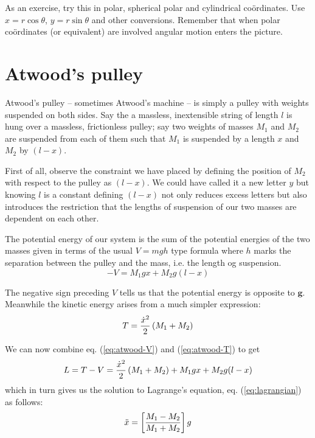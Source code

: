 \documentclass[english,seminar,headertitle]{lecture}
\begin{document}
As an exercise, try this in polar, spherical polar and cylindrical co\"{o}rdinates. Use $x=r\cos\theta$, $y=r\sin\theta$ and other conversions. Remember that when polar co\"{o}rdinates (or equivalent) are involved angular motion enters the picture.

\section{Atwood's pulley}

Atwood's pulley -- sometimes Atwood's machine -- is simply a pulley with weights suspended on both sides. Say the a massless, inextensible string of length $l$ is hung over a massless, frictionless pulley; say two weights of masses $M_1$ and $M_2$ are suspended from each of them such that $M_1$ is suspended by a length $x$ and $M_2$ by $(l-x)$.

First of all, observe the constraint we have placed by defining the position of $M_2$ with respect to the pulley as $(l-x)$. We could have called it a new letter $y$ but knowing $l$ is a constant defining $(l-x)$ not only reduces excess letters but also introduces the restriction that the lengths of suspension of our two masses are dependent on each other.

The potential energy of our system is the sum of the potential energies of the two masses given in terms of the usual $V = mgh$ type formula where $h$ marks the separation between the pulley and the mass, i.e. the length og suspension.
\begin{equation}
-V = M_1 g x + M_2 g (l-x)
\label{eq:atwood-V}
\end{equation}%

The negative sign preceding $V$ tells us that the potential energy is opposite to $\mathbf{g}$. Meanwhile the kinetic energy arises from a much simpler expression:
\begin{equation}
	T = {\dot{x}^2 \over 2} \left( M_1 + M_2 \right)
	\label{eq:atwood-T}
\end{equation}%

We can now combine eq. (\ref{eq:atwood-V}) and (\ref{eq:atwood-T}) to get
$$
L = T-V = {\dot{x}^2 \over 2} \left( M_1 + M_2 \right) + M_1 g x + M_2 g (l-x)
$$
which in turn gives us the solution to Lagrange's equation, eq. (\ref{eq:lagrangian}) as follows:
\begin{equation}
	\ddot{x} = \left[ { M_1 - M_2 \over M_1 + M_2 } \right] g
	\label{eq:atwood-result}
\end{equation}%
\end{document}

